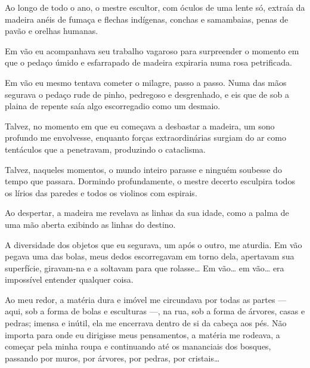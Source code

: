 Ao longo de todo o ano, o mestre escultor, com óculos de uma lente só, extraía
da madeira anéis de fumaça e flechas indígenas, conchas e samambaias, penas
de pavão e orelhas humanas.

Em vão eu acompanhava seu trabalho vagaroso para surpreender o momento em que
o pedaço úmido e esfarrapado de madeira expiraria numa rosa petrificada.

Em vão eu mesmo tentava cometer o milagre, passo a passo. Numa das mãos
segurava o pedaço rude de pinho, pedregoso e desgrenhado, e eis que de sob a
plaina de repente saía algo escorregadio como um desmaio.

Talvez, no momento em que eu começava a desbastar a madeira, um sono profundo
me envolvesse, enquanto forças extraordinárias surgiam do ar como tentáculos
que a penetravam, produzindo o cataclisma.

Talvez, naqueles momentos, o mundo inteiro parasse e ninguém soubesse do tempo
que passara. Dormindo profundamente, o mestre decerto esculpira todos os
lírios das paredes e todos os violinos com espirais.

Ao despertar, a madeira me revelava as linhas da sua idade, como a palma de
uma mão aberta exibindo as linhas do destino.

A diversidade dos objetos que eu segurava, um após o outro, me aturdia. Em vão
pegava uma das bolas, meus dedos escorregavam em torno dela, apertavam sua
superfície, giravam-na e a soltavam para que rolasse\ldots{} Em vão\ldots
{} em vão\ldots{} era impossível entender qualquer coisa.

Ao meu redor, a matéria dura e imóvel me circundava por todas as partes ---
aqui, sob a forma de bolas e esculturas ---, na rua, sob a forma de árvores,
casas e pedras; imensa e inútil, ela me encerrava dentro de si da cabeça aos
pés. Não importa para onde eu dirigisse meus pensamentos, a matéria me
rodeava, a começar pela minha roupa e continuando até os mananciais dos
bosques, passando por muros, por árvores, por pedras, por cristais\ldots{}


